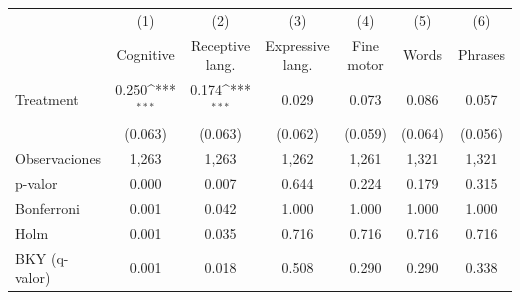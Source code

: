 {
\def\sym#1{\ifmmode^{#1}\else\(^{#1}\)\fi}
\begin{tabular}{l*{6}{c}}
\toprule
                    &\multicolumn{1}{c}{(1)}&\multicolumn{1}{c}{(2)}&\multicolumn{1}{c}{(3)}&\multicolumn{1}{c}{(4)}&\multicolumn{1}{c}{(5)}&\multicolumn{1}{c}{(6)}\\
                    &\multicolumn{1}{c}{Cognitive}&\multicolumn{1}{c}{Receptive lang.}&\multicolumn{1}{c}{Expressive lang.}&\multicolumn{1}{c}{Fine motor}&\multicolumn{1}{c}{Words}&\multicolumn{1}{c}{Phrases}\\
\midrule
Treatment           &       0.250\sym{***}&       0.174\sym{***}&       0.029         &       0.073         &       0.086         &       0.057         \\
                    &     (0.063)         &     (0.063)         &     (0.062)         &     (0.059)         &     (0.064)         &     (0.056)         \\
\midrule
Observaciones       &       1,263         &       1,263         &       1,262         &       1,261         &       1,321         &       1,321         \\
p-valor             &       0.000         &       0.007         &       0.644         &       0.224         &       0.179         &       0.315         \\
Bonferroni          &       0.001         &       0.042         &       1.000         &       1.000         &       1.000         &       1.000         \\
Holm                &       0.001         &       0.035         &       0.716         &       0.716         &       0.716         &       0.716         \\
BKY (q-valor)       &       0.001         &       0.018         &       0.508         &       0.290         &       0.290         &       0.338         \\
\bottomrule
\end{tabular}
}
